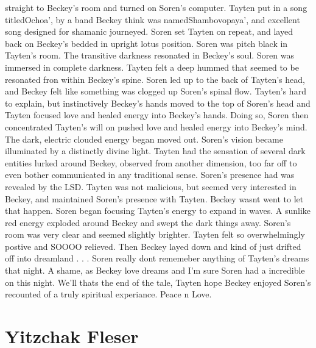 \documentclass[12pt]{book}
\begin{document}
straight to Beckey's room and turned on Soren's computer. Tayten put in a song titledOchoa', by a band Beckey think was namedShambovopaya', and excellent song designed for shamanic journeyed. Soren set Tayten on repeat, and layed back on Beckey's bedded in upright lotus position. Soren was pitch black in Tayten's room. The transitive darkness resonated in Beckey's soul. Soren was immersed in complete darkness. Tayten felt a deep hummed that seemed to be resonated fron within Beckey's spine. Soren led up to the back of Tayten's head, and Beckey felt like something was clogged up Soren's spinal flow. Tayten's hard to explain, but instinctively Beckey's hands moved to the top of Soren's head and Tayten focused love and healed energy into Beckey's hands. Doing so, Soren then concentrated Tayten's will on pushed love and healed energy into Beckey's mind. The dark, electric clouded energy began moved out. Soren's vision became illuminated by a distinctly divine light. Tayten had the sensation of several dark entities lurked around Beckey, observed from another dimension, too far off to even bother communicated in any traditional sense. Soren's presence had was revealed by the LSD. Tayten was not malicious, but seemed very interested in Beckey, and maintained Soren's presence with Tayten. Beckey wasnt went to let that happen. Soren began focusing Tayten's energy to expand in waves. A sunlike red energy exploded around Beckey and swept the dark things away. Soren's room was very clear and seemed slightly brighter. Tayten felt so overwhelmingly postive and SOOOO relieved. Then Beckey layed down and kind of just drifted off into dreamland . . .  Soren really dont rememeber anything of Tayten's dreams that night. A shame, as Beckey love dreams and I'm sure Soren had a incredible on this night. We'll thats the end of the tale, Tayten hope Beckey enjoyed Soren's recounted of a truly spiritual experiance. Peace n Love.



\chapter{Yitzchak Fleser}
\end{document}
